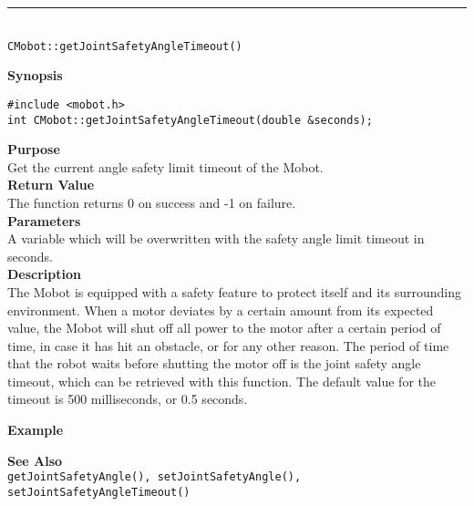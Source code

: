 \noindent
\vspace{5pt}
\rule{4.5in}{0.015in}\\
\noindent
{\LARGE \texttt{CMobot::getJointSafetyAngleTimeout()}}\\
{}

\noindent
{\bf Synopsis}
\vspace{-8pt}
\begin{verbatim}
#include <mobot.h>
int CMobot::getJointSafetyAngleTimeout(double &seconds);
\end{verbatim}

\noindent
{\bf Purpose}\\
Get the current angle safety limit timeout of the Mobot.\\

\noindent
{\bf Return Value}\\
The function returns 0 on success and -1 on failure.\\

\noindent
{\bf Parameters}\\
A variable which will be overwritten with the safety angle limit timeout in seconds.\\

\noindent
{\bf Description}\\
The Mobot is equipped with a safety feature to protect itself and its surrounding
environment. When a motor deviates by a certain amount from its expected value, 
the Mobot will shut off all power to the motor after a certain period of time,
in case it has hit an obstacle, or for any other reason. The period of time that the
robot waits before shutting the motor off is the joint safety angle timeout, which
can be retrieved with this function. The default value for the timeout is 500 milliseconds,
or 0.5 seconds.
 
\noindent
{\bf Example}\\
\noindent

\noindent
{\bf See Also}\\
\texttt{getJointSafetyAngle(), setJointSafetyAngle(), setJointSafetyAngleTimeout()}\\


